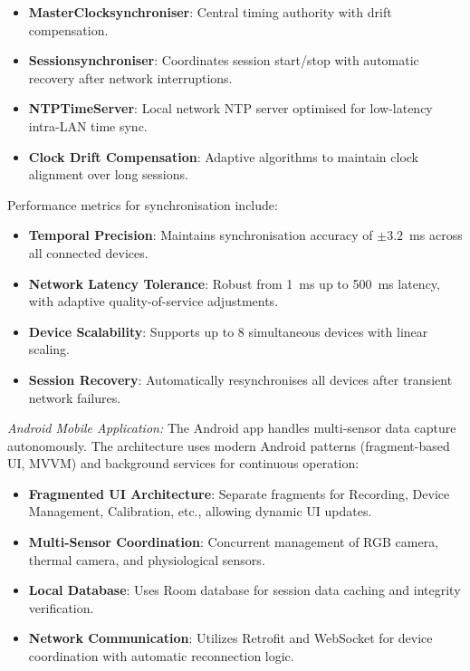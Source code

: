 \documentclass[11pt,a4paper]{report}
\begin{document}
{\begin{itemize}
    \item \textbf{MasterClocksynchroniser}: Central timing authority with drift compensation.
    \item \textbf{Sessionsynchroniser}: Coordinates session start/stop with automatic recovery after network interruptions.
    \item \textbf{NTPTimeServer}: Local network NTP server optimised for low-latency intra-LAN time sync.
    \item \textbf{Clock Drift Compensation}: Adaptive algorithms to maintain clock alignment over long sessions.
\end{itemize}

Performance metrics for synchronisation include:

\begin{itemize}
    \item \textbf{Temporal Precision}: Maintains synchronisation accuracy of $\pm3.2$~ms across all connected devices.
    \item \textbf{Network Latency Tolerance}: Robust from 1~ms up to 500~ms latency, with adaptive quality-of-service adjustments.
    \item \textbf{Device Scalability}: Supports up to 8 simultaneous devices with linear scaling.
    \item \textbf{Session Recovery}: Automatically resynchronises all devices after transient network failures.
\end{itemize}

\emph{Android Mobile Application:} The Android app handles multi-sensor data capture autonomously. The architecture uses modern Android patterns (fragment-based UI, MVVM) and background services for continuous operation:

\begin{itemize}
    \item \textbf{Fragmented UI Architecture}: Separate fragments for Recording, Device Management, Calibration, etc., allowing dynamic UI updates.
    \item \textbf{Multi-Sensor Coordination}: Concurrent management of RGB camera, thermal camera, and physiological sensors.
    \item \textbf{Local Database}: Uses Room database for session data caching and integrity verification.
    \item \textbf{Network Communication}: Utilizes Retrofit and WebSocket for device coordination with automatic reconnection logic.
\end{itemize}

}
\end{document}
